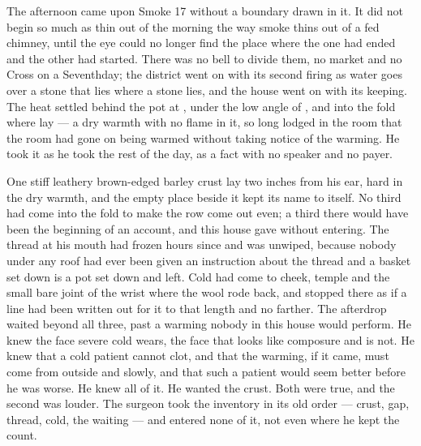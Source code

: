 The afternoon came upon Smoke 17 without a boundary drawn in it. It did not begin so much as thin out of the morning the way smoke thins out of a fed chimney, until the eye could no longer find the place where the one had ended and the other had started. There was no bell to divide them, no market and no Cross on a Seventhday; the district went on with its second firing as water goes over a stone that lies where a stone lies, and the house went on with its keeping. The heat settled behind the pot at , under the low angle of , and into the fold where  lay --- a dry warmth with no flame in it, so long lodged in the room that the room had gone on being warmed without taking notice of the warming. He took it as he took the rest of the day, as a fact with no speaker and no payer.

One stiff leathery brown-edged barley crust lay two inches from his ear, hard in the dry warmth, and the empty place beside it kept its name to itself. No third had come into the fold to make the row come out even; a third there would have been the beginning of an account, and this house gave without entering. The thread at his mouth had frozen hours since and was unwiped, because nobody under any roof had ever been given an instruction about the thread and a basket set down is a pot set down and left. Cold had come to cheek, temple and the small bare joint of the wrist where the wool rode back, and stopped there as if a line had been written out for it to that length and no farther. The afterdrop waited beyond all three, past a warming nobody in this house would perform. He knew the face severe cold wears, the face that looks like composure and is not. He knew that a cold patient cannot clot, and that the warming, if it came, must come from outside and slowly, and that such a patient would seem better before he was worse. He knew all of it. He wanted the crust. Both were true, and the second was louder. The surgeon took the inventory in its old order --- crust, gap, thread, cold, the waiting --- and entered none of it, not even where he kept the count.

